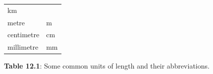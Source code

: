 {\begin{center}
\begin{xtabular*}{\mytablewidth}[t]{|p{10\mystarwidth}|p{10\mystarwidth}|}
        km%
     \tabularnewline{}
        metre &
        m%
     \tabularnewline{}
        centimetre &
        cm%
     \tabularnewline{}
        millimetre &
        mm%
     \tabularnewline{}
    \end{xtabular*}
      \end{center}
    \begin{center}{\small\bfseries Table 12.1}: Some common units of length and their abbreviations.\end{center}
        }%
    \par
    \label{m39370*cid4}
